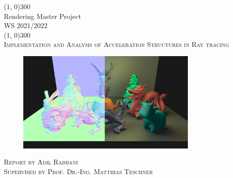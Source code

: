 \documentclass[11pt,a4paper]{article}
\begin{document}

\begin{titlepage}

	\begin{center}
	\line(1, 0){300}\\
	[0.25in]
	\huge{Rendering Master Project \\
					   WS 2021/2022} \\
	\line(1, 0){300}\\
	[0.75in]
	\textsc{\LARGE Implementation and Analysis of Acceleration Structures in Ray tracing}\\
	
	\begin{figure}[H]
		\centering
		\captionsetup{justification=centering,margin=2cm}
		\includegraphics[width=0.8\textwidth]{cover_image}
	\end{figure}
	
	\textsc{\Large Report by Adil Rabbani \\ Supervised by Prof. Dr.-Ing. Matthias Teschner}

	\end{center}

\end{titlepage}
\end{document}
